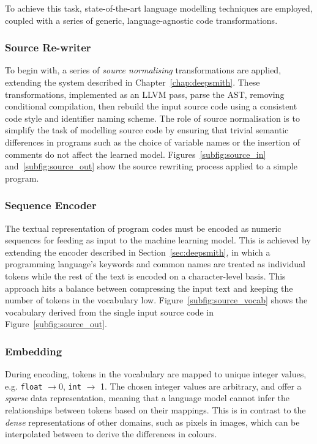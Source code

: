 To achieve this task, state-of-the-art language modelling techniques are employed, coupled with a series of generic, language-agnostic code transformations.

\subsubsection{Source Re-writer}

To begin with, a series of \emph{source normalising} transformations are applied, extending the system described in Chapter~\ref{chap:deepsmith}. These transformations, implemented as an LLVM pass, parse the AST, removing conditional compilation, then rebuild the input source code using a consistent code style and identifier naming scheme. The role of source normalisation is to simplify the task of modelling source code by ensuring that trivial semantic differences in programs such as the choice of variable names or the insertion of comments do not affect the learned model. Figures~\ref{subfig:source_in} and~\ref{subfig:source_out} show the source rewriting process applied to a simple program.

\subsubsection{Sequence Encoder}

The textual representation of program codes must be encoded as numeric sequences for feeding as input to the machine learning model. This is achieved by extending the encoder described in Section~\ref{sec:deepsmith}, in which a programming language's keywords and common names are treated as individual tokens while the rest of the text is encoded on a character-level basis. This approach hits a balance between compressing the input text and keeping the number of tokens in the vocabulary low. Figure~\ref{subfig:source_vocab} shows the vocabulary derived from the single input source code in Figure~\ref{subfig:source_out}.

\subsubsection{Embedding}

During encoding, tokens in the vocabulary are mapped to unique integer values, e.g. \texttt{float} $\rightarrow 0$, \texttt{int} $\rightarrow$ 1. The chosen integer values are arbitrary, and offer a \emph{sparse} data representation, meaning that a language model cannot infer the relationships between tokens based on their mappings. This is in contrast to the \emph{dense} representations of other domains, such as pixels in images, which can be interpolated between to derive the differences in colours.

